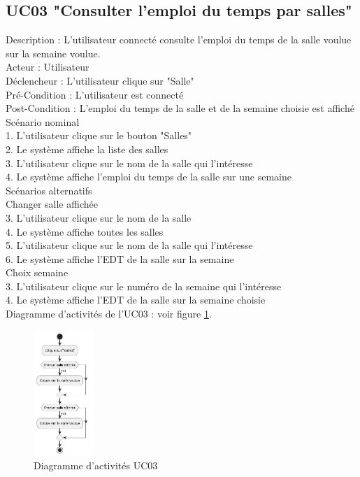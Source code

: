 \documentclass[a4paper,12pt]{article}
\begin{document}
\subsection{UC03 "Consulter l'emploi du temps par salles"}
Description : L'utilisateur connecté consulte l'emploi du temps de la salle voulue sur la semaine voulue.\\
Acteur : Utilisateur \\
Déclencheur : L'utilisateur clique sur "Salle"\\
Pré-Condition : L'utilisateur est connecté\\
Post-Condition : L'emploi du temps de la salle et de la semaine choisie est affiché
\\

Scénario nominal\\
1. L'utilisateur clique sur le bouton "Salles"\\
2. Le système affiche la liste des salles\\
3. L'utilisateur clique sur le nom de la salle qui l'intéresse\\
4. Le système affiche l'emploi du temps de la salle sur une semaine\\

Scénarios alternatifs\\
Changer salle affichée\\
3. L'utilisateur clique sur le nom de la salle\\
4. Le système affiche toutes les salles\\
5. L'utilisateur clique sur le nom de la salle qui l'intéresse\\
6. Le système affiche l'EDT de la salle sur la semaine\\

Choix semaine\\
3. L'utilisateur clique sur le numéro de la semaine qui l'intéresse\\
4. Le système affiche l'EDT de la salle sur la semaine choisie\\

Diagramme d'activités de l'UC03 : voir figure \ref{fig:act_03}.\\
\begin{figure}[h]
    \centering
    \includegraphics[width=0.2\textwidth]{Diag_activites_UC03.png}
    \caption{Diagramme d'activités UC03}
    \label{fig:act_03}
\end{figure}
\end{document}
